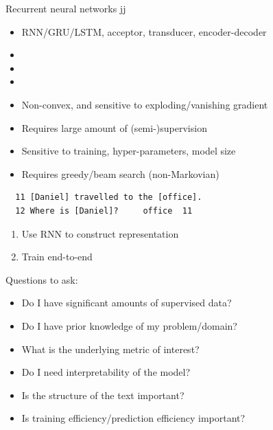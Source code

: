 \documentclass{beamer}
\begin{document}
\begin{frame}
  Recurrent neural networks
jj  \begin{itemize}
  \item RNN/GRU/LSTM, acceptor, transducer, encoder-decoder
  \end{itemize}

  \begin{itemize}
  \item {}
  \item {}
  \item {}
  \item \alert{Non-convex, and sensitive to exploding/vanishing gradient}
  \item \alert{Requires large amount of (semi-)supervision}
  \item \alert{Sensitive to training, hyper-parameters, model size}
  \item Requires greedy/beam search (non-Markovian)
  \end{itemize}
\end{frame}

\begin{frame}
\begin{verbatim}
  11 [Daniel] travelled to the [office].
  12 Where is [Daniel]?     office  11
\end{verbatim}

  \begin{enumerate}
  \item Use RNN to construct representation
  \item Train end-to-end
  \end{enumerate}
\end{frame}

\begin{frame}
  Questions to ask: 
  \begin{itemize}
  \item Do I have significant amounts of supervised data?
  \item Do I have prior knowledge of my problem/domain?
  \item What is the underlying metric of interest?
  \item Do I need interpretability of the model? 
  \item Is the structure of the text important?
  \item Is training efficiency/prediction efficiency important?
  \end{itemize}
\end{frame}
\end{document}

